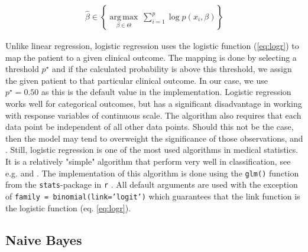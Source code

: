 \documentclass[../thesis.tex]{subfiles}
\begin{document}
\begin{align}
    \hat{\beta} \in \left\{ {\underset {\beta \in \Theta }{\operatorname {arg\,max} }}\ \sum_{i=1}^p\log p(x_i, \beta)\right\}
\end{align}

\noindent Unlike linear regression, logistic regression uses the logistic function (\ref{eq:logr}) to map the patient to a given clinical outcome. The mapping is done by selecting a threshold $p^\star$ and if the calculated probability is above this threshold, we assign the given patient to that particular clinical outcome. In our case, we use $p^\star = 0.50$ as this is the default value in the implementation. Logistic regression works well for categorical outcomes, but has a significant disadvantage in working with response variables of continuous scale. The algorithm also requires that each data point be independent of all other data points. Should this not be the case, then the model may tend to overweight the significance of those observations, \cite{friedman2009elements} and \cite{james2013introduction}. Still, logistic regression is one of the most used algorithms in medical statistics. It is a relatively "simple" algorithm that perform very well in classification, see e.g. \cite{austin2013using} and \cite{zolfaghar2013big}. The implementation of this algorithm is done using the \texttt{glm()} function from the \texttt{stats}-package in \texttt{r} \citep{stats}. All default arguments are used with the exception of \texttt{family = binomial(link='logit')} which guarantees that the link function is the logistic function (eq. \ref{eq:logr}).

\subsection{Naive Bayes}
\label{subsec:nb}
\end{document}
